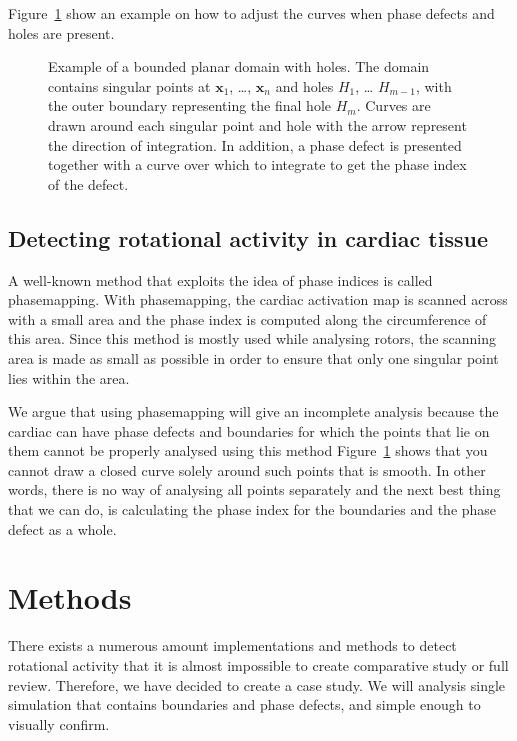 \documentclass[twocolumn]{article}
\begin{document}
Figure~\ref{fig:index_calculation} show an example on how to adjust the curves
when phase defects and holes are present.

\begin{figure}[ht]
  \centering
  \caption{Example of a bounded planar domain with holes. The domain
    contains singular points at \(\pmb{x}_1\), \ldots, \(\pmb{x}_n\) and
    holes \(H_1\), \ldots{} \(H_{m-1}\), with the outer boundary
    representing the final hole \(H_m\). Curves are drawn around each
    singular point and hole with the arrow represent the direction of
    integration. In addition, a phase defect is presented together with a
  curve over which to integrate to get the phase index of the defect.}
  \label{fig:index_calculation}
\end{figure}

\subsection{Detecting rotational activity in cardiac
tissue}\label{detecting-rotational-activity-in-cardiac-tissue}

A well-known method that exploits the idea of phase indices is called
phasemapping. With phasemapping, the cardiac activation map is scanned
across with a small area and the phase index is computed along the
circumference of this area. Since this method is mostly used while
analysing rotors, the scanning area is made as small as possible in
order to ensure that only one singular point lies within the area.

We argue that using phasemapping will give an incomplete analysis
because the cardiac can have phase defects and boundaries for which the
points that lie on them cannot be properly analysed using this method
Figure~\ref{fig:index_calculation} shows that you cannot draw a
closed curve solely around
such points that is smooth. In other words, there is no way of analysing
all points separately and the next best thing that we can do, is
calculating the phase index for the boundaries and the phase defect as a
whole.

\section{Methods}\label{methods}

There exists a numerous amount implementations and methods to detect
rotational activity \autocite{pikunov2023the, gurevich2019robust,
li2020standardizing}
that it is almost impossible to create
comparative study or full review. Therefore, we have decided to create a
case study. We will analysis single simulation that contains boundaries
and phase defects, and simple enough to visually confirm.
\end{document}
